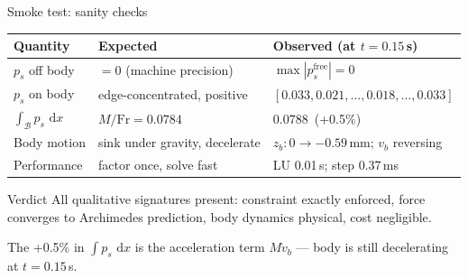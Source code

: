 \documentclass[aspectratio=169, 10pt]{beamer}
\newcommand{\Fr}{\mathrm{Fr}}
\newcommand{\dd}{\,\mathrm{d}}
\begin{document}
\begin{frame}{Smoke test: sanity checks}
\scriptsize
\begin{center}
\renewcommand{\arraystretch}{1.4}
\begin{tabular}{@{}p{3.3cm}p{4cm}p{5cm}@{}}
\toprule
Quantity & Expected & Observed (at $t=0.15$\,s) \\
\midrule
$p_s$ off body & $=0$ (machine precision) & $\max |p_s^{\text{free}}| = 0$ \\
$p_s$ on body & edge-concentrated, positive & $[0.033, 0.021, \ldots, 0.018, \ldots, 0.033]$ \\
$\int_\mathcal{B} p_s\,\dd x$ & $M/\Fr = 0.0784$ & $0.0788$\ (\alert{+0.5\%}) \\
Body motion & sink under gravity, decelerate & $z_b: 0 \to -0.59$\,mm; $v_b$ reversing \\
Performance & factor once, solve fast & LU 0.01\,s; step 0.37\,ms \\
\bottomrule
\end{tabular}
\end{center}

\vspace{0.6em}
\normalsize
\begin{block}{Verdict}
All qualitative signatures present: constraint exactly enforced, force converges to Archimedes prediction, body dynamics physical, cost negligible.
\end{block}

\vspace{0.3em}
\small The +0.5\% in $\int p_s\,\dd x$ is the acceleration term $M\dot v_b$ — body is still decelerating at $t=0.15$\,s.
\end{frame}
\end{document}
